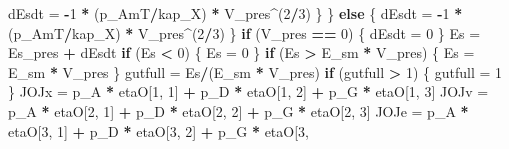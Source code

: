 \documentclass[]{article}
\newenvironment{Shaded}{\begin{snugshade}}{\end{snugshade}}
\newcommand{\DecValTok}[1]{\textcolor[rgb]{0.00,0.00,0.81}{#1}}
\newcommand{\StringTok}[1]{\textcolor[rgb]{0.31,0.60,0.02}{#1}}
\newcommand{\ControlFlowTok}[1]{\textcolor[rgb]{0.13,0.29,0.53}{\textbf{#1}}}
\newcommand{\OperatorTok}[1]{\textcolor[rgb]{0.81,0.36,0.00}{\textbf{#1}}}
\newcommand{\NormalTok}[1]{#1}
\begin{document}
\begin{Shaded}
\begin{Highlighting}[]
{{{\NormalTok{            dEsdt =}\StringTok{ }\OperatorTok{-}\DecValTok{1} \OperatorTok{*}\StringTok{ }\NormalTok{(p_AmT}\OperatorTok{/}\NormalTok{kap_X) }\OperatorTok{*}\StringTok{ }\NormalTok{V_pres}\OperatorTok{^}\NormalTok{(}\DecValTok{2}\OperatorTok{/}\DecValTok{3}\NormalTok{)}
\NormalTok{        \}}
\NormalTok{    \}}
    \ControlFlowTok{else}\NormalTok{ \{}
\NormalTok{        dEsdt =}\StringTok{ }\OperatorTok{-}\DecValTok{1} \OperatorTok{*}\StringTok{ }\NormalTok{(p_AmT}\OperatorTok{/}\NormalTok{kap_X) }\OperatorTok{*}\StringTok{ }\NormalTok{V_pres}\OperatorTok{^}\NormalTok{(}\DecValTok{2}\OperatorTok{/}\DecValTok{3}\NormalTok{)}
\NormalTok{    \}}
    \ControlFlowTok{if}\NormalTok{ (V_pres }\OperatorTok{==}\StringTok{ }\DecValTok{0}\NormalTok{) \{}
\NormalTok{        dEsdt =}\StringTok{ }\DecValTok{0}
\NormalTok{    \}}
\NormalTok{    Es =}\StringTok{ }\NormalTok{Es_pres }\OperatorTok{+}\StringTok{ }\NormalTok{dEsdt}
    \ControlFlowTok{if}\NormalTok{ (Es }\OperatorTok{<}\StringTok{ }\DecValTok{0}\NormalTok{) \{}
\NormalTok{        Es =}\StringTok{ }\DecValTok{0}
\NormalTok{    \}}
    \ControlFlowTok{if}\NormalTok{ (Es }\OperatorTok{>}\StringTok{ }\NormalTok{E_sm }\OperatorTok{*}\StringTok{ }\NormalTok{V_pres) \{}
\NormalTok{        Es =}\StringTok{ }\NormalTok{E_sm }\OperatorTok{*}\StringTok{ }\NormalTok{V_pres}
\NormalTok{    \}}
\NormalTok{    gutfull =}\StringTok{ }\NormalTok{Es}\OperatorTok{/}\NormalTok{(E_sm }\OperatorTok{*}\StringTok{ }\NormalTok{V_pres)}
    \ControlFlowTok{if}\NormalTok{ (gutfull }\OperatorTok{>}\StringTok{ }\DecValTok{1}\NormalTok{) \{}
\NormalTok{        gutfull =}\StringTok{ }\DecValTok{1}
\NormalTok{    \}}
\NormalTok{    JOJx =}\StringTok{ }\NormalTok{p_A }\OperatorTok{*}\StringTok{ }\NormalTok{etaO[}\DecValTok{1}\NormalTok{, }\DecValTok{1}\NormalTok{] }\OperatorTok{+}\StringTok{ }\NormalTok{p_D }\OperatorTok{*}\StringTok{ }\NormalTok{etaO[}\DecValTok{1}\NormalTok{, }\DecValTok{2}\NormalTok{] }\OperatorTok{+}\StringTok{ }\NormalTok{p_G }\OperatorTok{*}\StringTok{ }\NormalTok{etaO[}\DecValTok{1}\NormalTok{, }
        \DecValTok{3}\NormalTok{]}
\NormalTok{    JOJv =}\StringTok{ }\NormalTok{p_A }\OperatorTok{*}\StringTok{ }\NormalTok{etaO[}\DecValTok{2}\NormalTok{, }\DecValTok{1}\NormalTok{] }\OperatorTok{+}\StringTok{ }\NormalTok{p_D }\OperatorTok{*}\StringTok{ }\NormalTok{etaO[}\DecValTok{2}\NormalTok{, }\DecValTok{2}\NormalTok{] }\OperatorTok{+}\StringTok{ }\NormalTok{p_G }\OperatorTok{*}\StringTok{ }\NormalTok{etaO[}\DecValTok{2}\NormalTok{, }
        \DecValTok{3}\NormalTok{]}
\NormalTok{    JOJe =}\StringTok{ }\NormalTok{p_A }\OperatorTok{*}\StringTok{ }\NormalTok{etaO[}\DecValTok{3}\NormalTok{, }\DecValTok{1}\NormalTok{] }\OperatorTok{+}\StringTok{ }\NormalTok{p_D }\OperatorTok{*}\StringTok{ }\NormalTok{etaO[}\DecValTok{3}\NormalTok{, }\DecValTok{2}\NormalTok{] }\OperatorTok{+}\StringTok{ }\NormalTok{p_G }\OperatorTok{*}\StringTok{ }\NormalTok{etaO[}\DecValTok{3}\NormalTok{, }
}}}
\end{Highlighting}
\end{Shaded}
\end{document}
